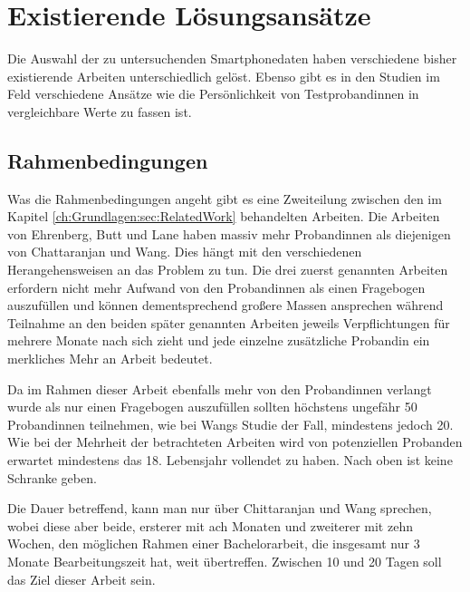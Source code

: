 \section{Existierende Lösungsansätze}
\label{ch:Analyse:sec:RelatedWork}

Die Auswahl der zu untersuchenden Smartphonedaten haben verschiedene bisher existierende Arbeiten unterschiedlich gelöst.
Ebenso gibt es in den Studien im Feld verschiedene Ansätze wie die Persönlichkeit von Testprobandinnen in vergleichbare Werte zu fassen ist.

\subsection{Rahmenbedingungen}

Was die Rahmenbedingungen angeht gibt es eine Zweiteilung zwischen den im Kapitel \ref{ch:Grundlagen:sec:RelatedWork} behandelten Arbeiten.
Die Arbeiten von Ehrenberg, Butt und Lane haben massiv mehr Probandinnen als diejenigen von Chattaranjan und Wang.
Dies hängt mit den verschiedenen Herangehensweisen an das Problem zu tun.
Die drei zuerst genannten Arbeiten erfordern nicht mehr Aufwand von den Probandinnen als einen Fragebogen auszufüllen und können dementsprechend großere Massen ansprechen
während Teilnahme an den beiden später genannten Arbeiten jeweils Verpflichtungen für mehrere Monate nach sich zieht und jede einzelne zusätzliche Probandin ein merkliches Mehr an Arbeit bedeutet.
\par
Da im Rahmen dieser Arbeit ebenfalls mehr von den Probandinnen verlangt wurde als nur einen Fragebogen auszufüllen sollten höchstens ungefähr 50 Probandinnen teilnehmen, wie bei Wangs Studie der Fall, mindestens jedoch 20.
Wie bei der Mehrheit der betrachteten Arbeiten wird von potenziellen Probanden erwartet mindestens das 18. Lebensjahr vollendet zu haben. Nach oben ist keine Schranke geben.
\par
Die Dauer betreffend, kann man nur über Chittaranjan und Wang sprechen, wobei diese aber beide, ersterer mit ach Monaten und zweiterer mit zehn Wochen, den möglichen Rahmen einer Bachelorarbeit, die insgesamt nur 3 Monate Bearbeitungszeit hat, weit übertreffen.
Zwischen 10 und 20 Tagen soll das Ziel dieser Arbeit sein.

